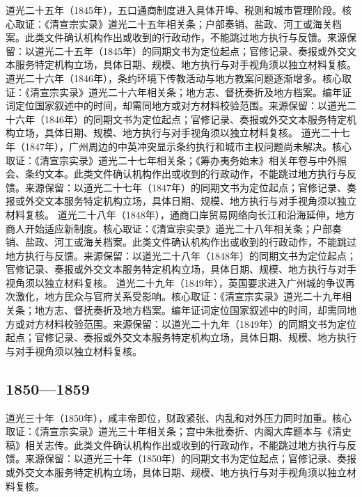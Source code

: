 道光二十五年（1845年），五口通商制度进入具体开埠、税则和城市管理阶段。核心取证：《清宣宗实录》道光二十五年相关条；户部奏销、盐政、河工或海关档案。此类文件确认机构作出或收到的行政动作，不能跳过地方执行与反馈。来源保留：以道光二十五年（1845年）的同期文书为定位起点；官修记录、奏报或外交文本服务特定机构立场，具体日期、规模、地方执行与对手视角须以独立材料复核。
道光二十六年（1846年），条约环境下传教活动与地方教案问题逐渐增多。核心取证：《清宣宗实录》道光二十六年相关条；地方志、督抚奏折及地方档案。编年证词定位国家叙述中的时间，却需同地方或对方材料校验范围。来源保留：以道光二十六年（1846年）的同期文书为定位起点；官修记录、奏报或外交文本服务特定机构立场，具体日期、规模、地方执行与对手视角须以独立材料复核。
道光二十七年（1847年），广州周边的中英冲突显示条约执行和城市主权问题尚未解决。核心取证：《清宣宗实录》道光二十七年相关条；《筹办夷务始末》相关年卷与中外照会、条约文本。此类文件确认机构作出或收到的行政动作，不能跳过地方执行与反馈。来源保留：以道光二十七年（1847年）的同期文书为定位起点；官修记录、奏报或外交文本服务特定机构立场，具体日期、规模、地方执行与对手视角须以独立材料复核。
道光二十八年（1848年），通商口岸贸易网络向长江和沿海延伸，地方商人开始适应新制度。核心取证：《清宣宗实录》道光二十八年相关条；户部奏销、盐政、河工或海关档案。此类文件确认机构作出或收到的行政动作，不能跳过地方执行与反馈。来源保留：以道光二十八年（1848年）的同期文书为定位起点；官修记录、奏报或外交文本服务特定机构立场，具体日期、规模、地方执行与对手视角须以独立材料复核。
道光二十九年（1849年），英国要求进入广州城的争议再次激化，地方民众与官府关系受影响。核心取证：《清宣宗实录》道光二十九年相关条；地方志、督抚奏折及地方档案。编年证词定位国家叙述中的时间，却需同地方或对方材料校验范围。来源保留：以道光二十九年（1849年）的同期文书为定位起点；官修记录、奏报或外交文本服务特定机构立场，具体日期、规模、地方执行与对手视角须以独立材料复核。
\subsection{1850—1859}
道光三十年（1850年），咸丰帝即位，财政紧张、内乱和对外压力同时加重。核心取证：《清宣宗实录》道光三十年相关条；宫中朱批奏折、内阁大库题本与《清史稿》相关志传。此类文件确认机构作出或收到的行政动作，不能跳过地方执行与反馈。来源保留：以道光三十年（1850年）的同期文书为定位起点；官修记录、奏报或外交文本服务特定机构立场，具体日期、规模、地方执行与对手视角须以独立材料复核。

